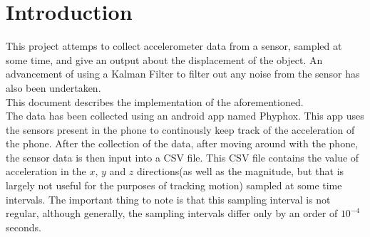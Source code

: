 \documentclass[oneside]{book}
\begin{document}

\newpage
\tableofcontents
\newpage
\Large

\chapter{Introduction}
This project attemps to collect accelerometer data from a sensor, sampled at some time, and give an output about the displacement of the object. An advancement of using a Kalman Filter to filter out any noise from the sensor has also been undertaken.\\ 
This document describes the implementation of the aforementioned. \\
\bigskip
The data has been collected using an android app named Phyphox. This app uses the sensors present in the phone to continously keep track of the acceleration of the phone. After the collection of the data, after moving around with the phone, the sensor data is then input into a CSV file. This CSV file contains the value of acceleration in the $x$, $y$ and $z$ directions(as well as the magnitude, but that is largely not useful for the purposes of tracking motion) sampled at some time intervals. The important thing to note is that this sampling interval is not regular, although generally, the sampling intervals differ only by an order of $10^{-4}$ seconds. 

\newpage
\end{document}
